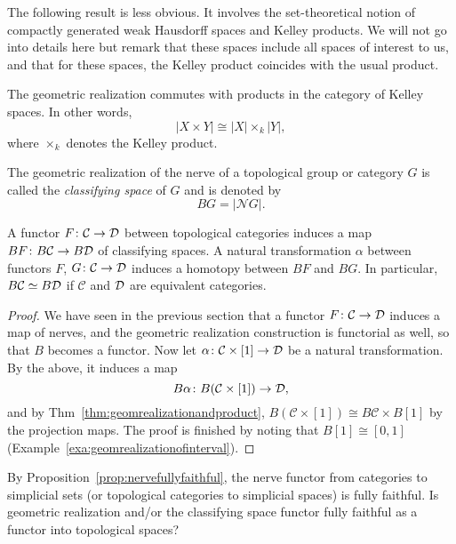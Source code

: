\documentclass[a4paper,openany]{scrbook}
\renewcommand{\C}{\mathcal C}
\newcommand{\nerve}{\mathcal N}
\begin{document}
The following result is less obvious. It involves the set-theoretical notion of compactly generated weak Hausdorff spaces and Kelley products. We will not go into details here but remark that these spaces include all spaces of interest to us, and that for these spaces, the Kelley product coincides with the usual product. 
\begin{thm} \label{thm:geomrealizationandproduct}
The geometric realization commutes with products in the category of Kelley spaces. In other words,
\[
| X \times Y | \cong |X| \times_k |Y|,
\]
where $\times_k$ denotes the Kelley product.
\end{thm}

\begin{defn}
The geometric realization of the nerve of a topological group or category $G$ is called the \emph{classifying space} of $G$ and is denoted by
\[
BG = |\nerve G|.
\]
\end{defn}



\begin{lemma}\label{lemma:classifyinghomotopy}
A functor $F\colon \C \to \D$ between topological categories induces a map $BF\colon B\C \to B\D$ of classifying spaces. A natural transformation $\alpha$ between functors $F$, $G\colon \C \to \D$ induces a homotopy between $BF$ and $BG$. In particular, $B\C \simeq B\D$ if $\C$ and $\mathcal D$ are equivalent categories.
\end{lemma}
\begin{proof}
We have seen in the previous section that a functor $F\colon \C \to \D$ induces a map of nerves, and the geometric realization construction is functorial as well, so that $B$ becomes a functor. Now let $\alpha\colon \C \times [1] \to \D$ be a natural transformation. By the above, it induces a map
\[
B\alpha\colon B(\C \times [1]) \to \D,
\]
and by Thm~\ref{thm:geomrealizationandproduct}, $B(\C \times [1]) \cong B\C \times B[1]$ by the projection maps. The proof is finished by noting that $B[1] \cong [0,1]$ (Example~\ref{exa:geomrealizationofinterval}).
\end{proof}

\begin{exer}
By Proposition~\ref{prop:nervefullyfaithful}, the nerve functor from categories to simplicial sets (or topological categories to simplicial spaces) is fully faithful. Is geometric realization and/or the classifying space functor fully faithful as a functor into topological spaces?
\end{exer}
\end{document}
